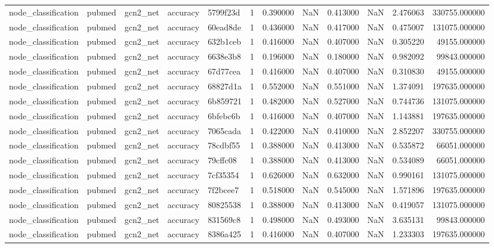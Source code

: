 \begin{tabular}{lllllrrrrrrr}
node_classification & pubmed & gcn2_net & accuracy & 5799f23d & 1 & 0.390000 & NaN & 0.413000 & NaN & 2.476063 & 330755.000000 \\
node_classification & pubmed & gcn2_net & accuracy & 60ead8de & 1 & 0.436000 & NaN & 0.417000 & NaN & 0.475007 & 131075.000000 \\
node_classification & pubmed & gcn2_net & accuracy & 632b1ceb & 1 & 0.416000 & NaN & 0.407000 & NaN & 0.305220 & 49155.000000 \\
node_classification & pubmed & gcn2_net & accuracy & 6638e3b8 & 1 & 0.196000 & NaN & 0.180000 & NaN & 0.982092 & 99843.000000 \\
node_classification & pubmed & gcn2_net & accuracy & 67d77cea & 1 & 0.416000 & NaN & 0.407000 & NaN & 0.310830 & 49155.000000 \\
node_classification & pubmed & gcn2_net & accuracy & 68827d1a & 1 & 0.552000 & NaN & 0.551000 & NaN & 1.374091 & 197635.000000 \\
node_classification & pubmed & gcn2_net & accuracy & 6b859721 & 1 & 0.482000 & NaN & 0.527000 & NaN & 0.744736 & 131075.000000 \\
node_classification & pubmed & gcn2_net & accuracy & 6bfebc6b & 1 & 0.416000 & NaN & 0.407000 & NaN & 1.143881 & 197635.000000 \\
node_classification & pubmed & gcn2_net & accuracy & 7065cada & 1 & 0.422000 & NaN & 0.410000 & NaN & 2.852207 & 330755.000000 \\
node_classification & pubmed & gcn2_net & accuracy & 78cdbf55 & 1 & 0.388000 & NaN & 0.413000 & NaN & 0.535872 & 66051.000000 \\
node_classification & pubmed & gcn2_net & accuracy & 79cffc08 & 1 & 0.388000 & NaN & 0.413000 & NaN & 0.534089 & 66051.000000 \\
node_classification & pubmed & gcn2_net & accuracy & 7cf35354 & 1 & 0.626000 & NaN & 0.632000 & NaN & 0.990161 & 131075.000000 \\
node_classification & pubmed & gcn2_net & accuracy & 7f2bcee7 & 1 & 0.518000 & NaN & 0.545000 & NaN & 1.571896 & 197635.000000 \\
node_classification & pubmed & gcn2_net & accuracy & 80825538 & 1 & 0.388000 & NaN & 0.413000 & NaN & 0.419057 & 131075.000000 \\
node_classification & pubmed & gcn2_net & accuracy & 831569c8 & 1 & 0.498000 & NaN & 0.493000 & NaN & 3.635131 & 99843.000000 \\
node_classification & pubmed & gcn2_net & accuracy & 8386a425 & 1 & 0.416000 & NaN & 0.407000 & NaN & 1.233303 & 197635.000000 \\

\end{tabular}
